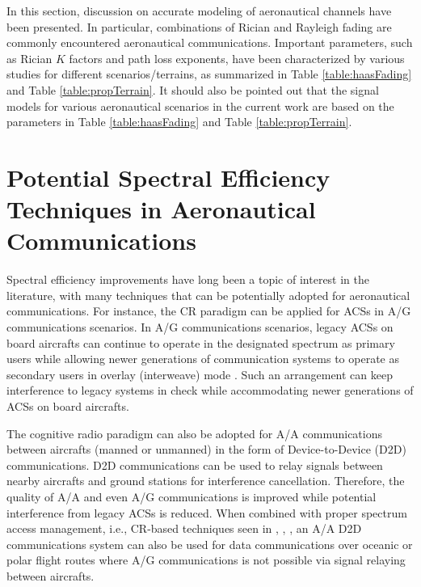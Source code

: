 In this section, discussion on accurate modeling of aeronautical channels have been presented. In particular, combinations of Rician and Rayleigh fading are commonly encountered aeronautical communications. Important parameters, such as Rician $K$ factors and path loss exponents, have been characterized by various studies for different scenarios/terrains, as summarized in Table \ref{table:haasFading} and Table \ref{table:propTerrain}. It should also be pointed out that the signal models for various aeronautical scenarios in the current work are based on the parameters in Table \ref{table:haasFading} and Table \ref{table:propTerrain}.

\section{Potential Spectral Efficiency Techniques in Aeronautical Communications}

Spectral efficiency improvements have long been a topic of interest in the literature, with many techniques that can be potentially adopted for aeronautical communications. For instance, the CR paradigm can be applied for ACSs in A/G communications scenarios. In A/G communications scenarios, legacy ACSs on board aircrafts can continue to operate in the designated spectrum as primary users while allowing newer generations of communication systems to operate as secondary users in overlay (interweave) mode \cite{jacobcognitive}. Such an arrangement can keep interference to legacy systems in check while accommodating newer generations of ACSs on board aircrafts. 

The cognitive radio paradigm can also be adopted for A/A communications between aircrafts (manned or unmanned) in the form of Device-to-Device (D2D) communications. D2D communications can be used to relay signals between nearby aircrafts and ground stations for interference cancellation. Therefore, the quality of A/A and even A/G communications is improved while potential interference from legacy ACSs is reduced. When combined with proper spectrum access management, i.e., CR-based techniques seen in \cite{min2011capacity}, \cite{chen2012downlink}, \cite{xu2014dynamic}, an A/A D2D communications system can also be used for data communications over oceanic or polar flight routes where A/G communications is not possible via signal relaying between aircrafts.

